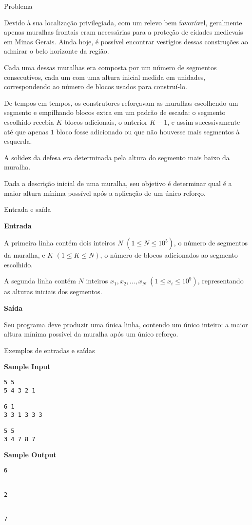\begin{frame}[fragile]{Problema}

Devido à sua localização privilegiada, com um relevo bem favorável, geralmente apenas muralhas
frontais eram necessárias para a proteção de cidades medievais em Minas Gerais. Ainda hoje, é
possível encontrar vestígios dessas construções ao admirar o belo horizonte da região.

Cada uma dessas muralhas era composta por um número de segmentos consecutivos, cada um com
uma altura inicial medida em unidades, correspondendo ao número de blocos usados para construí-lo.

De tempos em tempos, os construtores reforçavam as muralhas escolhendo um segmento e empilhando blocos 
extra em um padrão de escada: o segmento escolhido recebia $K$ blocos adicionais, o
anterior $K - 1$, e assim sucessivamente até que apenas $1$ bloco fosse adicionado ou que não houvesse
mais segmentos à esquerda.

A solidez da defesa era determinada pela altura do segmento mais baixo da muralha.

Dada a descrição inicial de uma muralha, seu objetivo é determinar qual é a maior altura mínima
possível após a aplicação de um único reforço.

\end{frame}

\begin{frame}[fragile]{Entrada e saída}

\textbf{Entrada}

A primeira linha contém dois inteiros $N$ $(1 \leq N \leq 10^5)$, o número de segmentos da muralha, e 
$K$ $(1 \leq K \leq N)$, o número de blocos adicionados ao segmento escolhido.

A segunda linha contém $N$ inteiros $x_1, x_2, \ldots, x_N$ $(1 \leq x_i\leq 10^9)$, representando as 
alturas iniciais dos segmentos.

\vspace{0.2in}

\textbf{Saída}

Seu programa deve produzir uma única linha, contendo um único inteiro: a maior altura mínima
possível da muralha após um único reforço.

\end{frame}

\begin{frame}[fragile]{Exemplos de entradas e saídas}

\begin{minipage}[t]{0.5\textwidth}
\textbf{Sample Input}
\begin{verbatim}
5 5
5 4 3 2 1

6 1
3 3 1 3 3 3

5 5
3 4 7 8 7
\end{verbatim}
\end{minipage}
\begin{minipage}[t]{0.45\textwidth}
\textbf{Sample Output}
\begin{verbatim}
6


2


7
\end{verbatim}
\end{minipage}
\end{frame}

